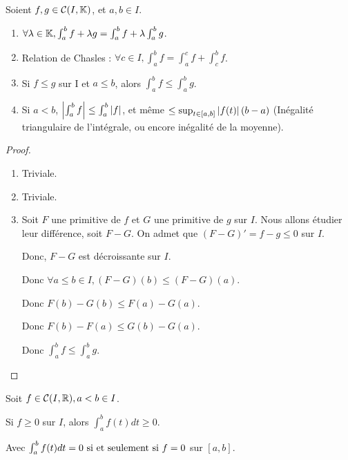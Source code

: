 \documentclass[12pt, a4paper]{report}
\begin{document}
\begin{property}
    Soient $f,g\in\mathcal{C}(I,\mathbb{K})$, et $a,b\in I$.

    \begin{enumerate}
        \item $\forall \lambda \in \mathbb{K}, \int_a^b f+\lambda g = \int_a^b f + \lambda \int_a^b g$.
        \item Relation de Chasles : $\forall c \in I, \int_a^b f = \int_a^c f + \int_c^b f$.
        \item Si $f\le g$ sur I et $a\le b$, alors $\int_a^b f \le \int_a^b g$.
        \item Si $a<b$, $\left|\int_a^b f\right| \le \int_a^b \left|f\right|$, et même $\le \sup_{t\in[a,b]} \left|f(t)\right| (b-a)$ (Inégalité triangulaire de l'intégrale, ou encore inégalité de la moyenne).
    \end{enumerate}

\end{property}

\begin{proof}
    \begin{enumerate}
        \item Triviale.
        \item Triviale.
        \item Soit $F$ une primitive de $f$ et $G$ une primitive de $g$ sur $I$. Nous allons étudier leur différence, soit $F-G$. On admet que $(F-G)'=f-g\le 0$ sur $I$.
        
        Donc, $F-G$ est décroissante sur $I$.

        Donc $\forall a\le b \in I, (F-G)(b) \le (F-G)(a)$.

        Donc $F(b)-G(b) \le F(a)-G(a)$.
        
        Donc $F(b)-F(a) \le G(b)-G(a)$.
        
        Donc $\int_a^b f \le \int_a^b g$.


    \end{enumerate}
\end{proof}

\begin{consequence}
    Soit $f\in\mathcal{C}(I,\mathbb{R}),a<b\in I$.

    Si $f\ge 0$ sur $I$, alors $\int_a^b f(t)dt \ge 0$.

    Avec $\int_a^b f(t)dt = 0 \text{ si et seulement si } f=0$ sur $[a,b]$.
\end{consequence}
\end{document}
